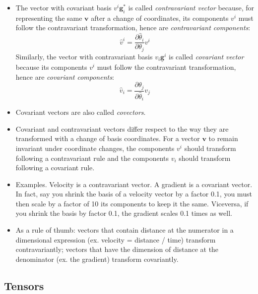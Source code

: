 \documentclass{digitaldynamics}
\def\vect#1{\bm{#1}}
\def\vcovar#1{{\bm{#1}}^*}
\def\vcontr#1{\underline{\bm{#1}}}
\begin{document}
\begin{itemize}
\item The vector with covariant basis $v^i \vcovar{g}_i$ is called \textit{contravariant vector} because, for representing the same $\vect{v}$ after a change of coordinates, its components $v^i$ must follow the contravariant transformation, hence are \textit{contravariant components}: 
\[
	\hat{v}^i = \frac{\partial \hat{\theta}_i}{\partial \theta_j} v^i
\]
Similarly, the vector with contravariant basis $v_i \vcontr{g}^i$ is called \textit{covariant vector} because its components $v^i$ must follow the contravariant transformation, hence are \textit{covariant components}:
	\[
	\hat{v}_i = \frac{\partial {\theta}_j}{\partial \hat{\theta}_i} v_j
	\]

\item Covariant vectors are also called \textit{covectors}.

\item Covariant and contravariant vectors differ respect to the way they are transformed with a change of basis coordinates.
	For a vector $\vect{v}$ to remain invariant under coordinate changes, the components $v^i$ should transform following a 
	contravariant rule and the components $v_i$ should transform following a covariant rule.

\item Examples. Velocity is a contravariant vector. A gradient is a covariant vector. In fact, say you shrink the basis of a velocity vector by a factor 0.1, you must then scale by a factor of 10 its components to keep it the same. Viceversa, if you shrink the basis by factor 0.1, the gradient scales 0.1 times as well.

\item As a rule of thumb: vectors that contain distance at the numerator in a dimensional expression (ex. velocity = distance / time) transform contravariantly; vectors that have the dimension of distance at the denominator (ex. the gradient) transform covariantly.

\end{itemize}



\subsection{Tensors}
\end{document}
